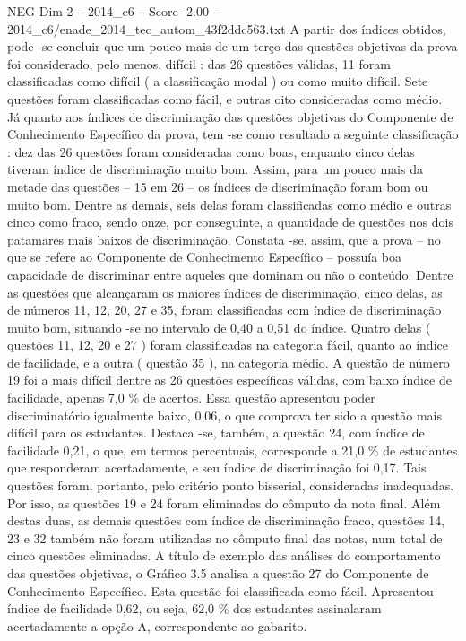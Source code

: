 \begin{textsample}{NEG Dim 2 – 2014\_c6 – Score -2.00 – 2014\_c6/enade\_2014\_tec\_autom\_43f2ddc563.txt}
A partir dos índices obtidos, pode -se concluir que um pouco mais de um terço das questões objetivas da prova foi considerado, pelo menos, difícil : das 26 questões válidas, 11 foram classificadas como difícil ( a classificação modal ) ou como muito difícil.
Sete questões foram classificadas como fácil, e outras oito consideradas como médio.
Já quanto aos índices de discriminação das questões objetivas do Componente de Conhecimento Específico da prova, tem -se como resultado a seguinte classificação : dez das 26 questões foram consideradas como boas, enquanto cinco delas tiveram índice de discriminação muito bom.
Assim, para um pouco mais da metade das questões – 15 em 26 – os índices de discriminação foram bom ou muito bom.
Dentre as demais, seis delas foram classificadas como médio e outras cinco como fraco, sendo onze, por conseguinte, a quantidade de questões nos dois patamares mais baixos de discriminação.
Constata -se, assim, que a prova – no que se refere ao Componente de Conhecimento Específico – possuía boa capacidade de discriminar entre aqueles que dominam ou não o conteúdo.
Dentre as questões que alcançaram os maiores índices de discriminação, cinco delas, as de números 11, 12, 20, 27 e 35, foram classificadas com índice de discriminação muito bom, situando -se no intervalo de 0,40 a 0,51 do índice.
Quatro delas ( questões 11, 12, 20 e 27 ) foram classificadas na categoria fácil, quanto ao índice de facilidade, e a outra ( questão 35 ), na categoria médio.
A questão de número 19 foi a mais difícil dentre as 26 questões específicas válidas, com baixo índice de facilidade, apenas 7,0 \% de acertos.
Essa questão apresentou poder discriminatório igualmente baixo, 0,06, o que comprova ter sido a questão mais difícil para os estudantes.
Destaca -se, também, a questão 24, com índice de facilidade 0,21, o que, em termos percentuais, corresponde a 21,0 \% de estudantes que responderam acertadamente, e seu índice de discriminação foi 0,17.
Tais questões foram, portanto, pelo critério ponto bisserial, consideradas inadequadas.
Por isso, as questões 19 e 24 foram eliminadas do cômputo da nota final.
Além destas duas, as demais questões com índice de discriminação fraco, questões 14, 23 e 32 também não foram utilizadas no cômputo final das notas, num total de cinco questões eliminadas.
A título de exemplo das análises do comportamento das questões objetivas, o Gráfico 3.5 analisa a questão 27 do Componente de Conhecimento Específico.
Esta questão foi classificada como fácil.
Apresentou índice de facilidade 0,62, ou seja, 62,0 \% dos estudantes assinalaram acertadamente a opção A, correspondente ao gabarito.

\end{textsample}
